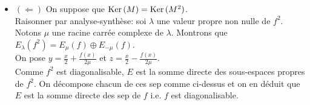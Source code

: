 \begin{preuve}
\begin{itemize}
        \item $(\Leftarrow)$ On suppose que $\mathrm{Ker}\,(M) = \mathrm{Ker}\,(M^2)$. \\
        Raisonner par analyse-synthèse: soi $\lambda$ une valeur propre non nulle de $f^2$. Notons $\mu$ une racine carrée complexe de $\lambda$. Montrons que $E_{\lambda}(f^2) = E_{\mu}(f) \oplus E_{-\mu}(f)$. \\
        On pose $y = \frac{x}{2} + \frac{f(x)}{2 \mu}$ et $z = \frac{x}{2} - \frac{f(x)}{2 \mu}$. \\
        Comme $f^2$ est diagonalisable, $E$ est la somme directe des sous-espaces propres de $f^2$. On décompose chacun de ces sep comme ci-dessus et on en déduit que $E$ est la somme directe des sep de $f$ i.e. $f$ est diagonalisable. 
    \end{itemize}
\end{preuve}
